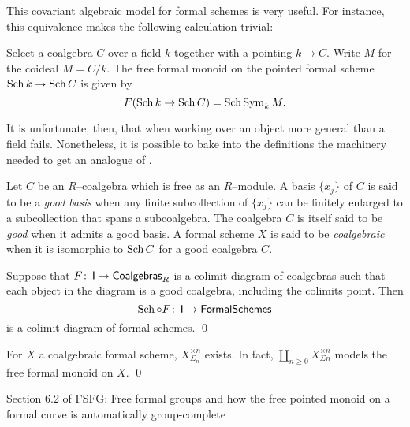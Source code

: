 This covariant algebraic model for formal schemes is very useful.    For instance, this equivalence makes the following calculation trivial:
\begin{lemma}
Select a coalgebra $C$ over a field $k$ together with a pointing $k \to C$.  Write $M$ for the coideal $M = C / k$.  The free formal monoid on the pointed formal scheme $\operatorname{Sch} k \to \operatorname{Sch} C$ is given by  \[F(\Sch k \to \Sch C) = \Sch \Sym_k M. \qed\]
\end{lemma}

It is unfortunate, then, that when working over an object more general than a field  fails.  Nonetheless, it is possible to bake into the definitions the machinery needed to get an analogue of .

\begin{definition}
Let $C$ be an $R$--coalgebra which is free as an $R$--module.  A basis $\{x_j\}$ of $C$ is said to be a \textit{good basis} when any finite subcollection of $\{x_j\}$ can be finitely enlarged to a subcollection that spans a subcoalgebra.  The coalgebra $C$ is itself said to be \textit{good} when it admits a good basis.  A formal scheme $X$ is said to be \textit{coalgebraic} when it is isomorphic to $\operatorname{Sch} C$ for a good coalgebra $C$.
\end{definition}

\begin{theorem}
Suppose that $F\colon\thinspace \mathsf{I} \to \mathsf{Coalgebras}_R$ is a colimit diagram of coalgebras such that each object in the diagram is a good coalgebra, including the colimits point.  Then \[\operatorname{Sch} \circ F\colon\thinspace \mathsf{I} \to \mathsf{FormalSchemes}\] is a colimit diagram of formal schemes. \qed
\end{theorem}

\begin{corollary}
For $X$ a coalgebraic formal scheme, $X^{\times n}_{\Sigma_n}$ exists.  In fact, $\coprod_{n \ge 0} X^{\times n}_{\Sigma n}$ models the free formal monoid on $X$. \qed
\end{corollary}






Section 6.2 of FSFG: Free formal groups and how the free pointed monoid on a formal curve is automatically group-complete




